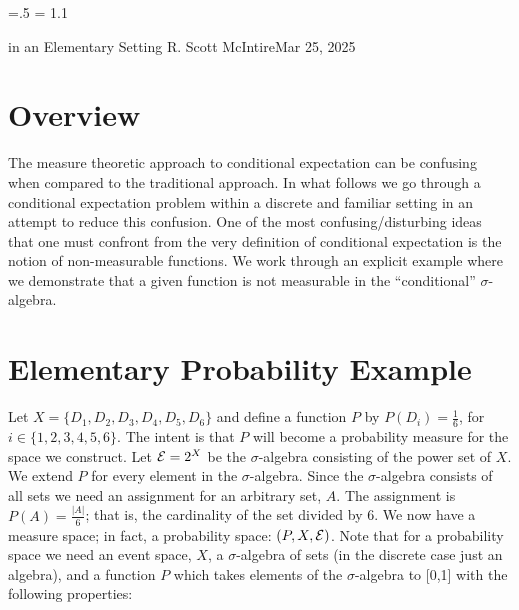 




\parindent=0pt
\parskip=.5\baselineskip
\baselineskip = 1.1\baselineskip

\footline{\hss\tenrm\folio\hss}

        {in an Elementary Setting}
{R. Scott McIntire}{Mar 25, 2025}

\section{Overview}
The measure theoretic approach to conditional expectation can be confusing
when compared to the traditional approach.
In what follows we go through a conditional 
expectation problem within a discrete and familiar setting in an attempt 
to reduce this confusion. One of the most confusing/disturbing ideas that 
one must confront from the very definition of conditional expectation is 
the notion of non-measurable functions. We work through an explicit
example where we demonstrate that a given function is not measurable in 
the ``conditional'' $\sigma$-algebra.


\section{Elementary Probability Example}
Let $X = \{D_1, D_2, D_3, D_4, D_5, D_6\}$ and define a function $P$ by 
$P(D_i) = \frac{1}{6}$, for $i\in \{1,2,3,4,5,6\}$. The intent is that $P$ will 
become a probability measure for the space we construct.
Let ${\cal E} = 2^X$ be the $\sigma$-algebra 
consisting of the power set of $X$. We extend $P$ for every element in the $\sigma$-algebra.
Since the $\sigma$-algebra consists of all sets 
we need an assignment for an arbitrary set, $A$. 
The assignment is $P(A) = \frac{|A|}{6}$; that is, the cardinality of the set divided by 6.
We now have a measure space; in fact, a probability space: $(P,X,{\cal E})$.
Note that for a probability space we need an event space, $X$, a $\sigma$-algebra of sets 
(in the discrete case just an algebra), and a function $P$ which takes 
elements of the $\sigma$-algebra to [0,1] with the following properties:

